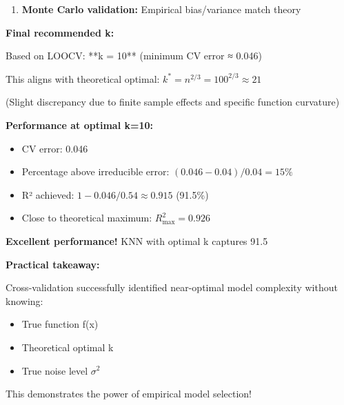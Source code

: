 \documentclass[12pt]{article}
\begin{document}
\begin{solution}
\begin{enumerate}
    \item \textbf{Monte Carlo validation:} Empirical bias/variance match theory
\end{enumerate}

\textbf{Final recommended k:}

Based on LOOCV: **k = 10** (minimum CV error ≈ 0.046)

This aligns with theoretical optimal: $k^* = n^{2/3} = 100^{2/3} \approx 21$

(Slight discrepancy due to finite sample effects and specific function curvature)

\textbf{Performance at optimal k=10:}

\begin{itemize}
    \item CV error: 0.046
    \item Percentage above irreducible error: $(0.046-0.04)/0.04 = 15\%$
    \item R² achieved: $1 - 0.046/0.54 \approx 0.915$ (91.5\%)
    \item Close to theoretical maximum: $R^2_{\max} = 0.926$
\end{itemize}

\textbf{Excellent performance!} KNN with optimal k captures 91.5%

\textbf{Practical takeaway:}

Cross-validation successfully identified near-optimal model complexity without knowing:
\begin{itemize}
    \item True function f(x)
    \item Theoretical optimal k
    \item True noise level $\sigma^2$
\end{itemize}

This demonstrates the power of empirical model selection!

\end{solution}
\end{document}
